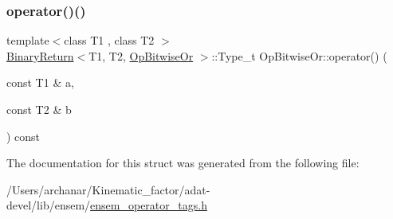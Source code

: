 \subsubsection{\texorpdfstring{operator()()}{operator()()}\hspace{0.1cm}{\footnotesize\ttfamily [3/3]}}
{\footnotesize\ttfamily template$<$class T1 , class T2 $>$ \\
\mbox{\hyperlink{structBinaryReturn}{Binary\+Return}}$<$T1, T2, \mbox{\hyperlink{structOpBitwiseOr}{Op\+Bitwise\+Or}} $>$\+::Type\+\_\+t Op\+Bitwise\+Or\+::operator() (\begin{DoxyParamCaption}\item[{const T1 \&}]{a,  }\item[{const T2 \&}]{b }\end{DoxyParamCaption}) const\hspace{0.3cm}{\ttfamily [inline]}}



The documentation for this struct was generated from the following file\+:\begin{DoxyCompactItemize}
\item 
/\+Users/archanar/\+Kinematic\+\_\+factor/adat-\/devel/lib/ensem/\mbox{\hyperlink{adat-devel_2lib_2ensem_2ensem__operator__tags_8h}{ensem\+\_\+operator\+\_\+tags.\+h}}\end{DoxyCompactItemize}
